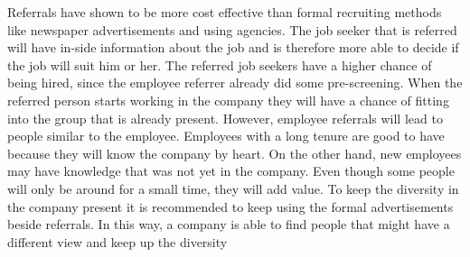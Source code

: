 \documentclass[main.tex]{subfiles}
\begin{document}
Referrals have shown to be more cost effective than formal recruiting methods like newspaper advertisements and using agencies.
The job seeker that is referred will have in-side information about the job and is therefore more able to decide if the job will suit him or her.
The referred job seekers have a higher chance of being hired, since the employee referrer already did some pre-screening.
When the referred person starts working in the company they will have a chance of fitting into the group that is already present. 
However, employee referrals will lead to people similar to the employee.
Employees with a long tenure are good to have because they will know the company by heart. On the other hand, new employees may have knowledge that was not yet in the company. Even though some people will only be around for a small time, they will add value. 
To keep the diversity in the company present it is recommended to keep using the formal advertisements beside referrals. 
In this way, a company is able to find people that might have a different view and keep up the diversity
\end{document}
